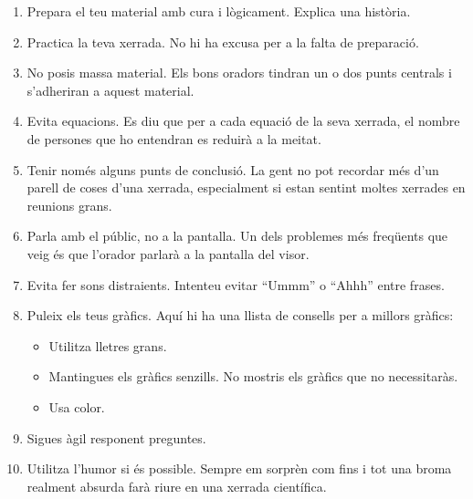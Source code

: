 \documentclass[12pt]{article}
\begin{document}
\begin{enumerate}

\item Prepara el teu material amb cura i lògicament. Explica una història.

\item Practica la teva xerrada. No hi ha excusa per a la falta de preparació.

\item No posis massa material. Els bons oradors tindran un o dos punts centrals i s'adheriran a aquest material.

\item Evita equacions. Es diu que per a cada equació de la seva xerrada, el nombre de persones que ho entendran es reduirà a la meitat. 

\item Tenir només alguns punts de conclusió. La gent no pot recordar més d'un parell de coses d'una xerrada, especialment si estan sentint moltes xerrades en reunions grans.

\item Parla amb el públic, no a la pantalla. Un dels problemes més freqüents que veig és que l'orador parlarà a la pantalla del visor.

\item Evita fer sons distraients. Intenteu evitar ``Ummm'' o ``Ahhh'' entre frases.

\item Puleix els teus gràfics. Aquí hi ha una llista de consells per a millors gràfics:

\begin{itemize}

    \item Utilitza lletres grans.

    \item Mantingues els gràfics senzills. No mostris els gràfics que no necessitaràs.

    \item Usa color.

\end{itemize}

\item Sigues àgil responent preguntes.

\item Utilitza l'humor si és possible. Sempre em sorprèn com fins i tot una broma realment absurda farà riure en una xerrada científica.

\end{enumerate}
\end{document}
